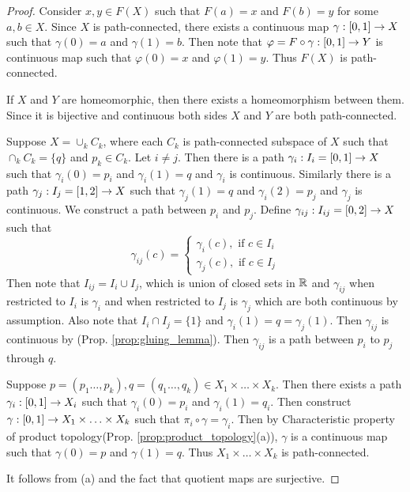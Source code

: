 \documentclass[11pt,a4paper]{article}
\begin{document}
\begin{proof}
 Consider $x,y\in F(X)$ such that $F(a) = x$ and $F(b) = y$ for some $a,b\in X$. Since $X$ is path-connected, there exists a continuous map $\gamma:[0,1]\rightarrow X$ such that $\gamma(0) = a$ and $\gamma(1) = b$. Then note that $\varphi = F\circ\gamma:[0,1]\rightarrow Y$ is continuous map such that $\varphi(0) = x$ and $\varphi(1) = y$. Thus $F(X)$ is path-connected.

 If $X$ and $Y$ are homeomorphic, then there exists a homeomorphism between them. Since it is bijective and continuous both sides $X$ and $Y$ are both path-connected.

 Suppose $X = \cup_k C_k$, where each $C_k$ is path-connected subspace of $X$ such that $\cap_k C_k = \{q\}$ and $p_k\in C_k$. Let $i\neq j$. Then there is a path $\gamma_i:I_i = [0,1]\rightarrow X$ such that $\gamma_i(0) = p_i$ and $\gamma_i(1) = q$ and $\gamma_i$ is continuous. Similarly there is a path $\gamma_j:I_j = [1,2]\rightarrow X$ such that $\gamma_j(1) = q$ and $\gamma_i(2) = p_j$ and $\gamma_j$ is continuous. We construct a path between $p_i$ and $p_j$. Define $\gamma_{ij}:I_{ij} = [0,2]\rightarrow X$ such that
\[
\gamma_{ij}(c) = 
\begin{cases}
\gamma_i(c), \text{ if }c \in I_i  \\
\gamma_j(c), \text{ if }c \in I_j  
\end{cases}
\]
Then note that $I_{ij} = I_i\cup I_j$, which is union of closed sets in $\mathbb{R}$ and $\gamma_{ij}$ when restricted to $I_i$ is $\gamma_i$ and when restricted to $I_j$ is $\gamma_j$ which are both continuous by assumption. Also note that $I_i\cap I_j = \{1\}$ and $\gamma_i(1) = q = \gamma_j(1)$. Then $\gamma_{ij}$ is continuous by (Prop. \ref{prop:gluing_lemma}). Then $\gamma_{ij}$ is a path between $p_i$ to $p_j$ through $q$. 

 Suppose $p = (p_1\ldots,p_k), q = (q_1\ldots,q_k)\in X_1\times\ldots\times X_k$. Then there exists a path $\gamma_i:[0,1]\rightarrow X_i$ such that $\gamma_i(0) = p_i$ and $\gamma_i(1) = q_i$. Then construct $\gamma:[0,1]\rightarrow X_1\times\ldots\times X_k$ such that $ \pi_i\circ\gamma = \gamma_i$. Then by Characteristic property of product topology(Prop. \ref{prop:product_topology}(a)), $\gamma$ is a continuous map such that $\gamma(0) = p$ and $\gamma(1) = q$. Thus $X_1\times\ldots\times X_k$ is path-connected.

 It follows from (a) and the fact that quotient maps are surjective.


\end{proof}
\end{document}
